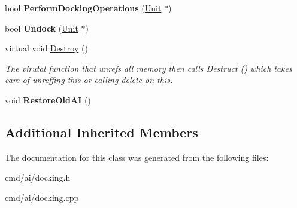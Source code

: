 \begin{DoxyCompactItemize}
\item 
bool {\bfseries Perform\+Docking\+Operations} (\hyperlink{classUnit}{Unit} $\ast$)\hypertarget{classOrders_1_1DockingOps_af3710294c032309ff0ec569d8ddf3d16}{}\label{classOrders_1_1DockingOps_af3710294c032309ff0ec569d8ddf3d16}

\item 
bool {\bfseries Undock} (\hyperlink{classUnit}{Unit} $\ast$)\hypertarget{classOrders_1_1DockingOps_a3e8953638805366c80624d71e481208a}{}\label{classOrders_1_1DockingOps_a3e8953638805366c80624d71e481208a}

\item 
virtual void \hyperlink{classOrders_1_1DockingOps_a8100dff0d09ee8e706b16b60c2477304}{Destroy} ()\hypertarget{classOrders_1_1DockingOps_a8100dff0d09ee8e706b16b60c2477304}{}\label{classOrders_1_1DockingOps_a8100dff0d09ee8e706b16b60c2477304}

\begin{DoxyCompactList}\small\item\em The virutal function that unrefs all memory then calls Destruct () which takes care of unreffing this or calling delete on this. \end{DoxyCompactList}\item 
void {\bfseries Restore\+Old\+AI} ()\hypertarget{classOrders_1_1DockingOps_a9b3e56121f535c1b94409a57243b08be}{}\label{classOrders_1_1DockingOps_a9b3e56121f535c1b94409a57243b08be}

\end{DoxyCompactItemize}
\subsection*{Additional Inherited Members}


The documentation for this class was generated from the following files\+:\begin{DoxyCompactItemize}
\item 
cmd/ai/docking.\+h\item 
cmd/ai/docking.\+cpp\end{DoxyCompactItemize}
